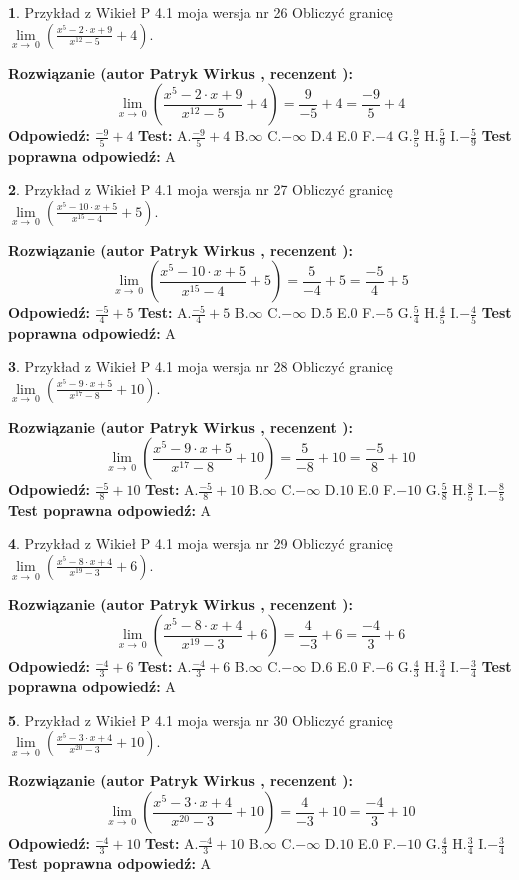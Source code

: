 \documentclass[12pt, a4paper]{article}
\theoremstyle{definition} %
\newtheorem{zad}{}
\newcommand{\zadStart}[1]{\begin{zad}#1\newline}
\newcommand{\zadStop}{\end{zad}}
\newcommand{\rozwStart}[2]{\noindent \textbf{Rozwiązanie (autor #1 , recenzent #2): }\newline}
\newcommand{\rozwStop}{\newline}
\newcommand{\odpStart}{\noindent \textbf{Odpowiedź:}\newline}
\newcommand{\odpStop}{\newline}
\newcommand{\testStart}{\noindent \textbf{Test:}\newline}
\newcommand{\testStop}{\newline}
\newcommand{\kluczStart}{\noindent \textbf{Test poprawna odpowiedź:}\newline}
\newcommand{\kluczStop}{\newline}
\begin{document}
\zadStart{Przykład z Wikieł P 4.1 moja wersja nr 26}
Obliczyć granicę $\lim\limits_{x\to\ 0}(\frac{x^{5}-2 \cdot x +9}{x^{12}-5}+4)$.
\zadStop
\rozwStart{Patryk Wirkus}{}
$$\lim\limits_{x\to\ 0}(\frac{x^{5}-2 \cdot x +9}{x^{12}-5}+4)=\frac{9}{-5}+4=\frac{-9}{5}+4$$
\rozwStop
\odpStart
$\frac{-9}{5}+4$
\odpStop
\testStart
A.$\frac{-9}{5}+4$
B.$\infty$
C.$-\infty$
D.$4$
E.$0$
F.$-4$
G.$\frac{9}{5}$
H.$\frac{5}{9}$
I.$-\frac{5}{9}$
\testStop
\kluczStart
A
\kluczStop



\zadStart{Przykład z Wikieł P 4.1 moja wersja nr 27}
Obliczyć granicę $\lim\limits_{x\to\ 0}(\frac{x^{5}-10 \cdot x +5}{x^{15}-4}+5)$.
\zadStop
\rozwStart{Patryk Wirkus}{}
$$\lim\limits_{x\to\ 0}(\frac{x^{5}-10 \cdot x +5}{x^{15}-4}+5)=\frac{5}{-4}+5=\frac{-5}{4}+5$$
\rozwStop
\odpStart
$\frac{-5}{4}+5$
\odpStop
\testStart
A.$\frac{-5}{4}+5$
B.$\infty$
C.$-\infty$
D.$5$
E.$0$
F.$-5$
G.$\frac{5}{4}$
H.$\frac{4}{5}$
I.$-\frac{4}{5}$
\testStop
\kluczStart
A
\kluczStop



\zadStart{Przykład z Wikieł P 4.1 moja wersja nr 28}
Obliczyć granicę $\lim\limits_{x\to\ 0}(\frac{x^{5}-9 \cdot x +5}{x^{17}-8}+10)$.
\zadStop
\rozwStart{Patryk Wirkus}{}
$$\lim\limits_{x\to\ 0}(\frac{x^{5}-9 \cdot x +5}{x^{17}-8}+10)=\frac{5}{-8}+10=\frac{-5}{8}+10$$
\rozwStop
\odpStart
$\frac{-5}{8}+10$
\odpStop
\testStart
A.$\frac{-5}{8}+10$
B.$\infty$
C.$-\infty$
D.$10$
E.$0$
F.$-10$
G.$\frac{5}{8}$
H.$\frac{8}{5}$
I.$-\frac{8}{5}$
\testStop
\kluczStart
A
\kluczStop



\zadStart{Przykład z Wikieł P 4.1 moja wersja nr 29}
Obliczyć granicę $\lim\limits_{x\to\ 0}(\frac{x^{5}-8 \cdot x +4}{x^{19}-3}+6)$.
\zadStop
\rozwStart{Patryk Wirkus}{}
$$\lim\limits_{x\to\ 0}(\frac{x^{5}-8 \cdot x +4}{x^{19}-3}+6)=\frac{4}{-3}+6=\frac{-4}{3}+6$$
\rozwStop
\odpStart
$\frac{-4}{3}+6$
\odpStop
\testStart
A.$\frac{-4}{3}+6$
B.$\infty$
C.$-\infty$
D.$6$
E.$0$
F.$-6$
G.$\frac{4}{3}$
H.$\frac{3}{4}$
I.$-\frac{3}{4}$
\testStop
\kluczStart
A
\kluczStop



\zadStart{Przykład z Wikieł P 4.1 moja wersja nr 30}
Obliczyć granicę $\lim\limits_{x\to\ 0}(\frac{x^{5}-3 \cdot x +4}{x^{20}-3}+10)$.
\zadStop
\rozwStart{Patryk Wirkus}{}
$$\lim\limits_{x\to\ 0}(\frac{x^{5}-3 \cdot x +4}{x^{20}-3}+10)=\frac{4}{-3}+10=\frac{-4}{3}+10$$
\rozwStop
\odpStart
$\frac{-4}{3}+10$
\odpStop
\testStart
A.$\frac{-4}{3}+10$
B.$\infty$
C.$-\infty$
D.$10$
E.$0$
F.$-10$
G.$\frac{4}{3}$
H.$\frac{3}{4}$
I.$-\frac{3}{4}$
\testStop
\kluczStart
A
\kluczStop
\end{document}

